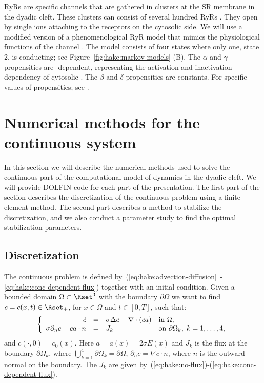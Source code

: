 RyRs are \Ca specific channels that are gathered in clusters at the SR
membrane in the dyadic cleft. These clusters can consist of several
hundred RyRs
\citep{BeuckelmannWier1988,Franzini-ArmstrongProtasiRamesh1999}. They
open by single \Ca ions attaching to the receptors on the cytosolic
side. We will use a modified version of a phenomenological RyR model
that mimics the physiological functions of the channel
\citep{SternSongEtAl1999}. The model consists of four states where only
one, state 2, is conducting; see Figure~\ref{fig:hake:markov-models}
(B). The $\alpha$ and $\gamma$ propensities are \Ca-dependent,
representing the activation and inactivation dependency of cytosolic
\CaC. The $\beta$ and $\delta$ propensities are constants. For
specific values of propensities; see \citet{SternSongEtAl1999}.

\section{Numerical methods for the continuous system}

In this section we will describe the numerical methods used to solve
the continuous part of the computational model of \Ca dynamics in the
dyadic cleft. We will provide DOLFIN code for each part of the
presentation. The first part of the section describes the
discretization of the continuous problem using a finite element
method. The second part describes a method to stabilize the
discretization, and we also conduct a parameter study to find the
optimal stabilization parameters.


\subsection{Discretization}
\label{sec:hake:discretization}

The continuous problem is defined
by~(\ref{eq:hake:advection-diffusion}~-\ref{eq:hake:conc-dependent-flux})
together with an initial condition. Given a bounded domain $\Omega
\subset \Rset^3$ with the boundary $\partial\Omega$ we want to find
$c = c(x,t) \in \Rset_+$, for $x\in \Omega$ and $t \in [0,T]$, such
that:
\begin{equation}
\label{eq:hake:full_system}
\left\{
  \begin{array}{r@{\quad=\quad}ll}
    \dot{c}&\sigma\Delta c - \nabla\cdot\left(ca\right)&  \text{in } \Omega, \\
    \sigma\partial_nc-ca\cdot n&J_k& \text{on } \partial\Omega_k,\; k = 1,\ldots,4,
  \end{array}
\right.
\end{equation}
and $c(\cdot,0) = c_0(x)$. Here $a=a(x)=2\sigma E(x)$ and $J_k$ is the
\kth flux at the \kth boundary $\partial\Omega_k$, where
$\bigcup^4_{k=1}\partial\Omega_k=\partial\Omega$, $\partial_nc =
\nabla c\cdot n$, where $n$ is the outward normal on the boundary. The
$J_k$ are given by~(\ref{eq:hake:no-flux})-(\ref{eq:hake:conc-dependent-flux}).

